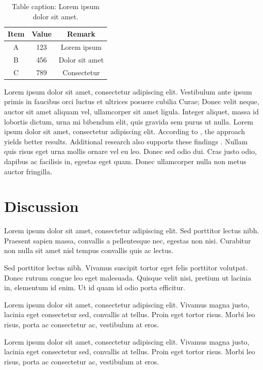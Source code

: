 \documentclass[12pt,twocolumn]{article}
\begin{document}
\begin{table}[h]
  \centering
  \begin{tabular}{|c|c|c|}
    \hline
    \textbf{Item} & \textbf{Value} & \textbf{Remark} \\
    \hline
    A & 123 & Lorem ipsum \\
    \hline
    B & 456 & Dolor sit amet \\
    \hline
    C & 789 & Consectetur \\
    \hline
  \end{tabular}
  \caption{Table caption: Lorem ipsum dolor sit amet.}
  \label{tab:example}
\end{table}

Lorem ipsum dolor sit  amet, consectetur adipiscing elit. Vestibulum ante ipsum primis in faucibus orci luctus et ultrices posuere cubilia Curae; Donec velit neque, auctor sit amet aliquam vel, ullamcorper sit amet ligula. Integer aliquet, massa id lobortis dictum, urna mi bibendum elit, quis gravida sem purus ut nulla. Lorem ipsum dolor sit amet, consectetur adipiscing elit. 
According to \citet{goodfellow2016deep}, the approach yields better results. Additional research also supports these findings \citep{bishop2006pattern}. Nullam quis risus eget urna mollis ornare vel eu leo. Donec sed odio dui. Cras justo odio, dapibus ac facilisis in, egestas eget quam. Donec ullamcorper nulla non metus auctor fringilla.

\section{Discussion}

Lorem ipsum dolor sit amet, consectetur adipiscing elit. Sed porttitor lectus nibh. Praesent sapien massa, convallis a pellentesque nec, egestas non nisi. Curabitur non nulla sit amet nisl tempus convallis quis ac lectus.

Sed porttitor lectus nibh. Vivamus suscipit tortor eget felis porttitor volutpat. Donec rutrum congue leo eget malesuada. Quisque velit nisi, pretium ut lacinia in, elementum id enim. Ut id quam id odio porta efficitur.

Lorem ipsum dolor sit amet, consectetur adipiscing elit. Vivamus magna justo, lacinia eget consectetur sed, convallis at tellus. Proin eget tortor risus. Morbi leo risus, porta ac consectetur ac, vestibulum at eros.

Lorem ipsum dolor sit amet, consectetur adipiscing elit. Vivamus magna justo, lacinia eget consectetur sed, convallis at tellus. Proin eget tortor risus. Morbi leo risus, porta ac consectetur ac, vestibulum at eros.
\end{document}
